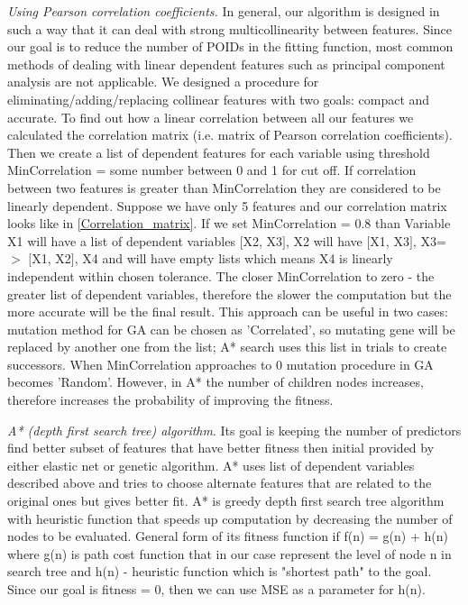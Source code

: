 \documentclass[aps,prl,reprint,amsmath,amssymb,nature]{revtex4-1}
\begin{document}
\textit{Using Pearson correlation coefficients.} In general, our algorithm is designed in such a way that it can deal with strong multicollinearity between features. Since our goal is to reduce the number of POIDs in the fitting function, most common methods of dealing with linear dependent features such as principal component analysis are not applicable. We designed a procedure for eliminating/adding/replacing collinear features with two goals: compact and accurate. To find out how a linear correlation between all our features we calculated the correlation matrix (i.e. matrix of Pearson correlation coefficients). Then we create a list of dependent features for each variable using threshold MinCorrelation = some number between 0 and 1 for cut off. If correlation between two features is greater than MinCorrelation they are considered to be linearly dependent. Suppose we have only 5 features and our correlation matrix looks like in \ref{Correlation_matrix}. If we set MinCorrelation = 0.8 than Variable X1 will have a list of dependent variables $[$X2, X3$]$, X2 will have $[$X1, X3$]$, X3=$>$ $[$X1, X2$]$, X4 and will have empty lists which means X4 is linearly independent within chosen tolerance. The closer MinCorrelation to zero - the greater list of dependent variables, therefore the slower the computation but the more accurate will be the final result. This approach can be useful in two cases: mutation method for GA can be chosen as 'Correlated', so mutating gene will be replaced by another one from the list; A* search uses this list in trials to create successors. When MinCorrelation approaches to 0 mutation procedure in GA becomes 'Random'. However, in A* the number of children nodes increases, therefore increases the probability of improving the fitness.

\textit{A* (depth first search tree) algorithm}. Its goal is keeping the number of predictors find better subset of features that have better fitness then initial provided by either elastic net or genetic algorithm. A* uses list of dependent variables described above and tries to choose alternate features that are related to the original ones but gives better fit. A* is greedy depth first search tree algorithm with heuristic function that speeds up computation by decreasing the number of nodes to be evaluated. General form of its fitness function if f(n) = g(n) + h(n) where g(n) is path cost function that in our case represent the level of node n in search tree and h(n) - heuristic function which is "shortest path" to the goal. Since our goal is fitness = 0, then we can use MSE as a parameter for h(n). 
\end{document}
